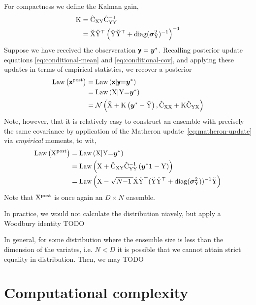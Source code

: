\documentclass{article}
\begin{document}
{For compactness we define the  Kalman gain,
\begin{align}
    \mathrm{K}
    &= \hat{\mathrm{C}}_{\mathrm{XY}} \hat{\mathrm{C}}_{\mathrm{YY}}^{-1}\\
    &=\breve{\mathrm{X}}\breve{\mathrm{Y}}^\top  \left(
        \breve{\mathrm{Y}}\breve{\mathrm{Y}}^\top+\operatorname{diag}(\boldsymbol{\sigma}^2_{\mathrm{Y}})^{-1}
    \right)^{-1}
    \label{eq:kalman_gain}
\end{align}
Suppose we have received the observeration $\boldsymbol{\mathsf{y}}=\boldsymbol{y}^*$.
Recalling posterior update equations \eqref{eq:conditional-mean} and \eqref{eq:conditional-cov}, and applying these updates in terms of empirical statistics, we recover a posterior
\begin{align}
    \operatorname{Law}\left(\boldsymbol{\mathsf{x}}^{\text{post}}\right)
    &=\operatorname{Law}\left(\boldsymbol{\mathsf{x}}|\boldsymbol{\mathsf{y}}{=}\boldsymbol{y}^*\right)\\
    &=\operatorname{Law}\left(\mathrm{X}|\mathrm{Y}{=}\boldsymbol{y}^*\right)\\
    &= \mathcal{N}\left(
        \bar{\mathrm{X}} +
        \mathrm{K}\left( \boldsymbol{y}^* - \bar{\mathrm{Y}}\right),
        \hat{\mathrm{C}}_{\mathrm{XX}} + \mathrm{K}\hat{\mathrm{C}}_{\mathrm{YX}}
        \right)
\end{align}
Note, however, that it is relatively easy to construct an ensemble with precisely the same covariance by application of the Matheron update~\eqref{eq:matheron-update} via \emph{empirical} moments, to wit,
\begin{align}
    \operatorname{Law}\left(\mathrm{X}^{\text{post}}\right)
    &=\operatorname{Law}\left(\mathrm{X}|\mathrm{Y}{=}\boldsymbol{y}^*\right)\\
    &=\operatorname{Law}\left(\mathrm{X} + \hat{\mathrm{C}}_{\mathrm{XY}} \hat{\mathrm{C}}_{\mathrm{YY}}^{-1} \left( \boldsymbol{y}^*\boldsymbol{1} - \mathrm{Y} \right)\right)\\
    &=\operatorname{Law}\left(\mathrm{X} -\sqrt{N{-}1\;} \breve{\mathrm{X}}\breve{\mathrm{Y}}^\top (\breve{\mathrm{Y}}\breve{\mathrm{Y}}^\top+\operatorname{diag}(\boldsymbol{\sigma}^2_{\mathrm{Y}}))^{-1} \breve{\mathrm{Y}}\right)
\end{align}
Note that $\mathrm{X}^{\text{post}}$ is once again an $D \times N$ ensemble.

In practice, we would not calculate the distribution niavely, but apply a Woodbury identity TODO

In general, for some distribution where the ensemble size is less than the dimension of the variates, i.e. $N< D$ it is possible that we cannot attain strict equality in distribution.
Then, we may TODO
\citep{Sriperumbudur2010Hilbert}


\section{Computational complexity}

}
\end{document}
